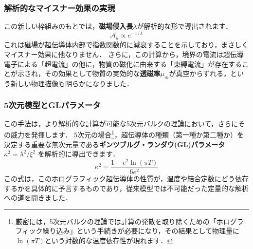 \documentclass[b5paper,11pt,dvipdfmx]{jsarticle}
\numberwithin{equation}{section}
\theoremstyle{definition}
\begin{document}
\subsubsection*{解析的なマイスナー効果の実現}

この新しい枠組みのもとでは，\textbf{磁場侵入長$\lambda$}が解析的な形で導出されます．
\begin{equation}
    \mathcal{A}_{y} \propto e^{-x/\lambda}
\end{equation}
これは磁場が超伝導体内部で指数関数的に減衰することを示しており，まさしくマイスナー効果に他なりません．
さらに，この計算から，境界の電流は超伝導電子による「超電流」の他に，物質の磁化に由来する「束縛電流」が存在することが示され，その効果として物質の実効的な\textbf{透磁率$\mu_m$}が真空からずれる，という新しい物理描像も明らかになりました．

\subsubsection*{5次元模型とGLパラメータ}

この手法は，より解析的な計算が可能な5次元バルクの理論において，さらにその威力を発揮します．
5次元の場合\footnote{
厳密には，5次元バルクの理論では計算の発散を取り除くための「ホログラフィック繰り込み」という手続きが必要になり，その結果として物理量に$\ln(\pi T)$という対数的な温度依存性が現れます．
}，超伝導体の種類（第一種か第二種か）を決定する重要な無次元量である\textbf{ギンツブルグ・ランダウ(GL)パラメータ $\kappa^2 = \lambda^2 / \xi^2$} を解析的に導出できます．
\begin{equation}
     \kappa^2 = \frac{1-e^{2}\ln(\pi T)}{6e^{2}}
\end{equation}
この式は，このホログラフィック超伝導体の性質が，温度や結合定数にどう依存するかを具体的に予言するものであり，従来模型では不可能だった定量的な解析への道を開きました．
\end{document}
